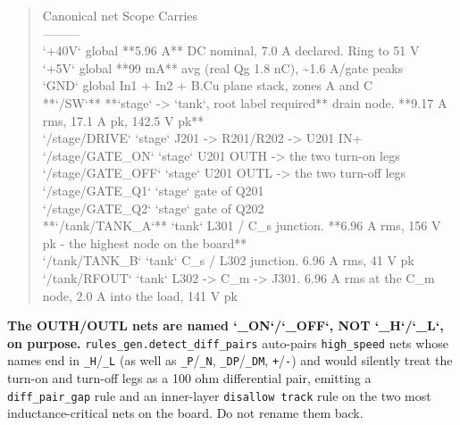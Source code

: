 \documentclass[11pt,a4paper]{article}
\begin{document}
\begin{quote}\small\ttfamily\raggedright
\textbar{} Canonical net \textbar{} Scope \textbar{} Carries \textbar{}\\
\textbar{}---\textbar{}---\textbar{}---\textbar{}\\
\textbar{} `+40V` \textbar{} global \textbar{} {*}{*}5.96 A{*}{*} DC nominal, 7.0 A declared. Ring to 51 V \textbar{}\\
\textbar{} `+5V` \textbar{} global \textbar{} {*}{*}99 mA{*}{*} avg (real Qg 1.8 nC), \textasciitilde{}1.6 A/gate peaks \textbar{}\\
\textbar{} `GND` \textbar{} global \textbar{} In1 + In2 + B.Cu plane stack, zones A and C \textbar{}\\
\textbar{} {*}{*}`/SW`{*}{*} \textbar{} {*}{*}`stage` -\textgreater{} `tank`, root label required{*}{*} \textbar{} drain node. {*}{*}9.17 A rms, 17.1 A pk, 142.5 V pk{*}{*} \textbar{}\\
\textbar{} `/stage/DRIVE` \textbar{} `stage` \textbar{} J201 -\textgreater{} R201/R202 -\textgreater{} U201 IN+ \textbar{}\\
\textbar{} `/stage/GATE\_ON` \textbar{} `stage` \textbar{} U201 OUTH -\textgreater{} the two turn-on legs \textbar{}\\
\textbar{} `/stage/GATE\_OFF` \textbar{} `stage` \textbar{} U201 OUTL -\textgreater{} the two turn-off legs \textbar{}\\
\textbar{} `/stage/GATE\_Q1` \textbar{} `stage` \textbar{} gate of Q201 \textbar{}\\
\textbar{} `/stage/GATE\_Q2` \textbar{} `stage` \textbar{} gate of Q202 \textbar{}\\
\textbar{} {*}{*}`/tank/TANK\_A`{*}{*} \textbar{} `tank` \textbar{} L301 / C\_s junction. {*}{*}6.96 A rms, 156 V pk - the highest node on the board{*}{*} \textbar{}\\
\textbar{} `/tank/TANK\_B` \textbar{} `tank` \textbar{} C\_s / L302 junction. 6.96 A rms, 41 V pk \textbar{}\\
\textbar{} `/tank/RFOUT` \textbar{} `tank` \textbar{} L302 -\textgreater{} C\_m -\textgreater{} J301. 6.96 A rms at the C\_m node, 2.0 A into the load, 141 V pk \textbar{}
\end{quote}
\textbf{The OUTH/OUTL nets are named `\_ON`/`\_OFF`, NOT `\_H`/`\_L`, on purpose.} \texttt{rules\_gen.detect\_diff\_pairs} auto-pairs \texttt{high\_speed} nets whose names end in \texttt{\_H}/\texttt{\_L} (as well as \texttt{\_P}/\texttt{\_N}, \texttt{\_DP}/\texttt{\_DM}, \texttt{+}/\texttt{-}) and would silently treat the turn-on and turn-off legs as a 100 ohm differential pair, emitting a \texttt{diff\_pair\_gap} rule and an inner-layer \texttt{disallow track} rule on the two most inductance-critical nets on the board. Do not rename them back.
\end{document}
